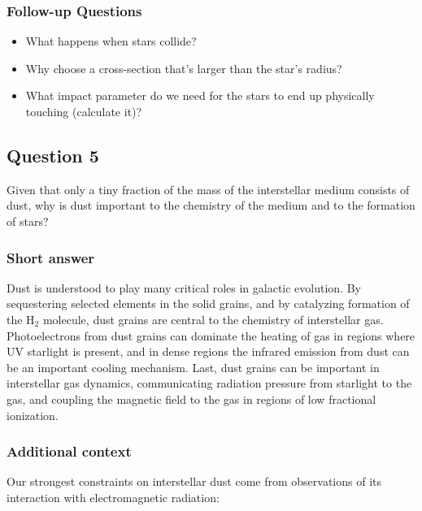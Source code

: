 \documentclass[a4paper,10pt]{article}
\begin{document}
\subsubsection{Follow-up Questions}

\begin{itemize}
    \item What happens when stars collide?
    \item Why choose a cross-section that's larger than the star's radius?
    \item What impact parameter do we need for the stars to end up physically touching (calculate it)?
\end{itemize}


\newpage
\subsection{Question 5}

Given that only a tiny fraction of the mass of the interstellar medium consists of dust, why is dust important to the chemistry of the medium and to the formation of stars?

\subsubsection{Short answer}

Dust is understood to play many critical roles in galactic evolution. By sequestering selected elements in the solid grains, and by catalyzing formation of the H$_2$ molecule, dust grains are central to the chemistry of interstellar gas. Photoelectrons from dust grains can dominate the heating of gas in regions where UV starlight is present, and in dense regions the infrared emission from dust can be an important cooling mechanism. Last, dust grains can be important in interstellar gas dynamics, communicating radiation pressure from starlight to the gas, and coupling the magnetic field to the gas in regions of low fractional ionization.

\subsubsection{Additional context}

Our strongest constraints on interstellar dust come from observations of its interaction with electromagnetic radiation:
\end{document}
